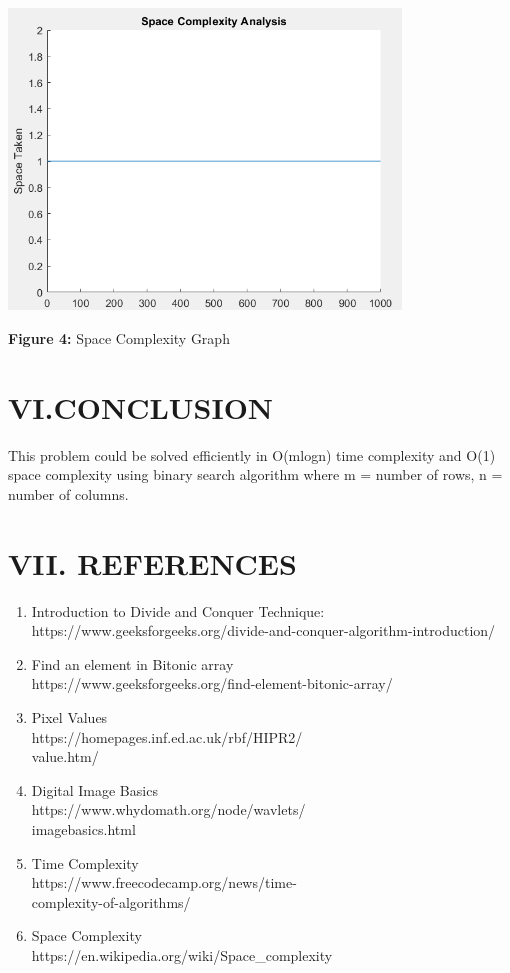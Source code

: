 \documentclass[10pt]{article}
\begin{document}
\begin{multicols*}{2}
\includegraphics[width=\columnwidth, height=8cm]{Space Complexity.png}\begin{center}\textbf{Figure 4:} Space Complexity Graph\end{center}

\section*{VI.CONCLUSION}

This problem could be solved efficiently in O(mlogn) time complexity and O(1) space complexity using binary search algorithm where m = number of rows, n = number of columns.

\section*{VII. REFERENCES}

\begin{enumerate}
\item Introduction to Divide and Conquer Technique:\\
https://www.geeksforgeeks.org/divide-and-conquer-algorithm-introduction/
\item Find an element in Bitonic array\\
https://www.geeksforgeeks.org/find-element-bitonic-array/
\item Pixel Values\\
https://homepages.inf.ed.ac.uk/rbf/HIPR2/\\value.htm/
\item Digital Image Basics\\
https://www.whydomath.org/node/wavlets/\\imagebasics.html
\item Time Complexity\\
https://www.freecodecamp.org/news/time-\\complexity-of-algorithms/
\item Space Complexity\\
https://en.wikipedia.org/wiki/Space\_complexity
\end{enumerate}
\end{multicols*}

	
\end{document}

